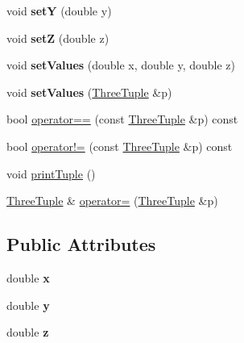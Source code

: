 \begin{DoxyCompactItemize}
\item 
\hypertarget{classCartWheel_1_1Math_1_1ThreeTuple_a229fe7276cf90102b029bc47df050eef}{
void {\bfseries setY} (double y)}
\label{classCartWheel_1_1Math_1_1ThreeTuple_a229fe7276cf90102b029bc47df050eef}

\item 
\hypertarget{classCartWheel_1_1Math_1_1ThreeTuple_ae22b5c37924f64c4e3c77a67b51cdcdd}{
void {\bfseries setZ} (double z)}
\label{classCartWheel_1_1Math_1_1ThreeTuple_ae22b5c37924f64c4e3c77a67b51cdcdd}

\item 
\hypertarget{classCartWheel_1_1Math_1_1ThreeTuple_a6294c95bcf72a7e54b0cc9147d25a145}{
void {\bfseries setValues} (double x, double y, double z)}
\label{classCartWheel_1_1Math_1_1ThreeTuple_a6294c95bcf72a7e54b0cc9147d25a145}

\item 
\hypertarget{classCartWheel_1_1Math_1_1ThreeTuple_a9c5a540f265c68c000ccff42c8462306}{
void {\bfseries setValues} (\hyperlink{classCartWheel_1_1Math_1_1ThreeTuple}{ThreeTuple} \&p)}
\label{classCartWheel_1_1Math_1_1ThreeTuple_a9c5a540f265c68c000ccff42c8462306}

\item 
bool \hyperlink{classCartWheel_1_1Math_1_1ThreeTuple_a2a8a513c11d07504ad63172d9229f7b2}{operator==} (const \hyperlink{classCartWheel_1_1Math_1_1ThreeTuple}{ThreeTuple} \&p) const 
\item 
bool \hyperlink{classCartWheel_1_1Math_1_1ThreeTuple_a1079126eb3c4dbe3ad019d918b62614b}{operator!=} (const \hyperlink{classCartWheel_1_1Math_1_1ThreeTuple}{ThreeTuple} \&p) const 
\item 
void \hyperlink{classCartWheel_1_1Math_1_1ThreeTuple_a65e25453060b2ccbfd1cd9a2f87b5078}{printTuple} ()
\item 
\hyperlink{classCartWheel_1_1Math_1_1ThreeTuple}{ThreeTuple} \& \hyperlink{classCartWheel_1_1Math_1_1ThreeTuple_a068cfb8297eae8bb4038301e8084e4c2}{operator=} (\hyperlink{classCartWheel_1_1Math_1_1ThreeTuple}{ThreeTuple} \&p)
\end{DoxyCompactItemize}
\subsection*{Public Attributes}
\begin{DoxyCompactItemize}
\item 
\hypertarget{classCartWheel_1_1Math_1_1ThreeTuple_af4418dbe73030cefdef89d4294f77045}{
double {\bfseries x}}
\label{classCartWheel_1_1Math_1_1ThreeTuple_af4418dbe73030cefdef89d4294f77045}

\item 
\hypertarget{classCartWheel_1_1Math_1_1ThreeTuple_a14eca289b2b1cc638c2552e53489e04c}{
double {\bfseries y}}
\label{classCartWheel_1_1Math_1_1ThreeTuple_a14eca289b2b1cc638c2552e53489e04c}

\item 
\hypertarget{classCartWheel_1_1Math_1_1ThreeTuple_a6897f3f2cadfa4de470ae2d93d2ceb12}{
double {\bfseries z}}
\label{classCartWheel_1_1Math_1_1ThreeTuple_a6897f3f2cadfa4de470ae2d93d2ceb12}

\end{DoxyCompactItemize}


